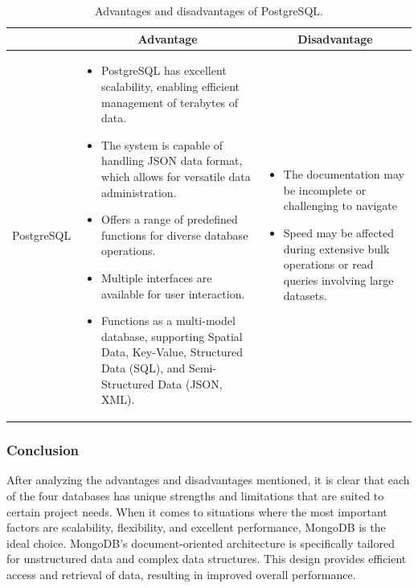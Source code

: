 \begin{table}[H]
    \centering
    \begin{tabular}{| c | p{} | p{} |}
        \hline
        \multicolumn{1}{|c|}{}
        & \multicolumn{1}{c|}{Advantage}
        & \multicolumn{1}{c|}{Disadvantage} \\ \hline
        \multirow{10}{*}{PostgreSQL}     
                &   \begin{itemize}[leftmargin=*,topsep=0pt,partopsep=0pt,parsep=0pt]
                        \item PostgreSQL has excellent scalability, enabling efficient management of terabytes of data.
                        \item The system is capable of handling JSON data format, which allows for versatile data administration.
                        \item Offers a range of predefined functions for diverse database operations.
                        \item Multiple interfaces are available for user interaction.
                        \item Functions as a multi-model database, supporting Spatial Data, Key-Value, Structured Data (SQL), and Semi-Structured Data (JSON, XML).
                    \end{itemize}
                &   \begin{itemize}[leftmargin=*,topsep=0pt,partopsep=0pt,parsep=0pt]
                        \item The documentation may be incomplete or challenging to navigate
                        \item Speed may be affected during extensive bulk operations or read queries involving large datasets.
                    \end{itemize} \\ \hline
    \end{tabular}
    \caption{Advantages and disadvantages of PostgreSQL.}
\end{table}

\subsubsection{Conclusion}

After analyzing the advantages and disadvantages mentioned, it is clear that each of the four databases has unique strengths and limitations that are suited to certain project needs. When it comes to situations where the most important factors are scalability, flexibility, and excellent performance, MongoDB is the ideal choice. MongoDB's document-oriented architecture is specifically tailored for unstructured data and complex data structures. This design provides efficient access and retrieval of data, resulting in improved overall performance.